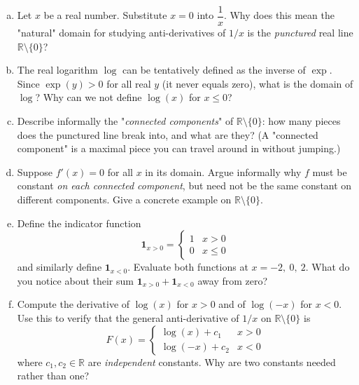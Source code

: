 \documentclass[12pt]{article}
\begin{document}
\begin{enumerate}[(a)]

    \item Let $x$ be a real number. Substitute $x = 0$ into $\dfrac{1}{x}$. Why does this mean the "natural" domain for studying anti-derivatives of $1/x$ is the \emph{punctured} real line $\mathbb{R} \setminus \{0\}$?

    \item The real logarithm $\log$ can be tentatively defined as the inverse of $\exp$. Since $\exp(y) > 0$ for all real $y$ (it never equals zero), what is the domain of $\log$? Why can we not define $\log(x)$ for $x \leq 0$?

    \item Describe informally the "\emph{connected components}" of $\mathbb{R} \setminus \{0\}$: how many pieces does the punctured line break into, and what are they? (A "connected component" is a maximal piece you can travel around in without jumping.)

    \item Suppose $f'(x) = 0$ for all $x$ in its domain. Argue informally why $f$ must be constant \emph{on each connected component}, but need not be the same constant on different components. Give a concrete example on $\mathbb{R} \setminus \{0\}$.

    \item Define the indicator function
    \[
        \mathbf{1}_{x>0} = \begin{cases} 1 & x > 0 \\ 0 & x \leq 0 \end{cases}
    \]
    and similarly define $\mathbf{1}_{x<0}$. Evaluate both functions at $x = -2,\ 0,\ 2$. What do you notice about their sum $\mathbf{1}_{x>0} + \mathbf{1}_{x<0}$ away from zero?

    \item Compute the derivative of $\log(x)$ for $x > 0$ and of $\log(-x)$ for $x < 0$. Use this to verify that the general anti-derivative of $1/x$ on $\mathbb{R} \setminus \{0\}$ is
    \[
        F(x) = \begin{cases}
            \log(x) + c_1 & x > 0 \\
            \log(-x) + c_2 & x < 0
        \end{cases}
    \]
    where $c_1, c_2 \in \mathbb{R}$ are \emph{independent} constants. Why are two constants needed rather than one?

    \newpage


\end{enumerate}
\end{document}
